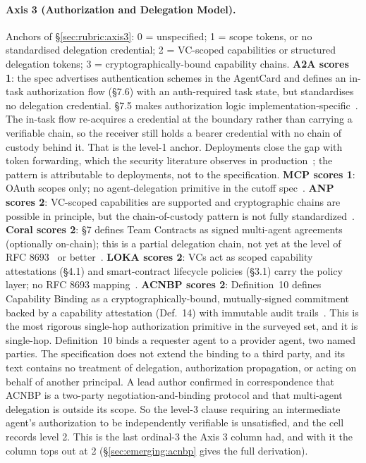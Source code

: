 \paragraph{Axis 3 (Authorization and Delegation Model).}
Anchors of \S\ref{sec:rubric:axis3}: 0 = unspecified; 1 =
scope tokens, or no standardised delegation credential;
2 = VC-scoped
capabilities or structured delegation tokens; 3 =
cryptographically-bound capability chains. \textbf{A2A
scores 1}: the spec advertises authentication schemes in
the AgentCard and defines an in-task authorization flow
(\S7.6) with an auth-required task state, but standardises
no delegation credential. \S7.5 makes authorization logic
implementation-specific~\cite{spec_a2a}. The in-task flow
re-acquires a credential at the boundary rather than
carrying a verifiable chain, so the receiver still holds a
bearer credential with no chain of custody behind it. That
is the level-1 anchor. Deployments close the gap with
token forwarding, which the security literature observes
in production~\cite{authz_propagation}; the pattern is
attributable to deployments, not to the specification. \textbf{MCP
scores 1}: OAuth scopes only; no agent-delegation
primitive in the cutoff spec~\cite{spec_mcp}.
\textbf{ANP scores 2}: VC-scoped capabilities are
supported and cryptographic chains are possible in
principle, but the chain-of-custody pattern is not fully
standardized~\cite{spec_anp}. \textbf{Coral scores 2}:
\S7 defines Team Contracts as signed multi-agent
agreements (optionally on-chain); this is a partial
delegation chain, not yet at the level of RFC
8693~\cite{rfc8693} or better~\cite{spec_coral}.
\textbf{LOKA scores 2}: VCs act as scoped capability
attestations (\S4.1) and smart-contract lifecycle
policies (\S3.1) carry the policy layer; no RFC 8693
mapping~\cite{spec_loka}. \textbf{ACNBP scores 2}:
Definition~10 defines Capability Binding as a
cryptographically-bound, mutually-signed commitment
backed by a capability attestation (Def.~14) with
immutable audit trails~\cite{spec_acnbp}. This is the
most rigorous single-hop authorization primitive in the
surveyed set, and it is single-hop. Definition~10 binds a
requester agent to a provider agent, two named parties.
The specification does not extend the binding to a third
party, and its text contains no treatment of delegation,
authorization propagation, or acting on behalf of another
principal. A lead author confirmed in correspondence that
ACNBP is a two-party negotiation-and-binding protocol and
that multi-agent delegation is outside its scope. So the
level-3 clause requiring an intermediate agent's
authorization to be independently verifiable is
unsatisfied, and the cell records level 2. This is the
last ordinal-3 the Axis 3 column had, and with it the
column tops out at 2
(\S\ref{sec:emerging:acnbp} gives the full derivation).

